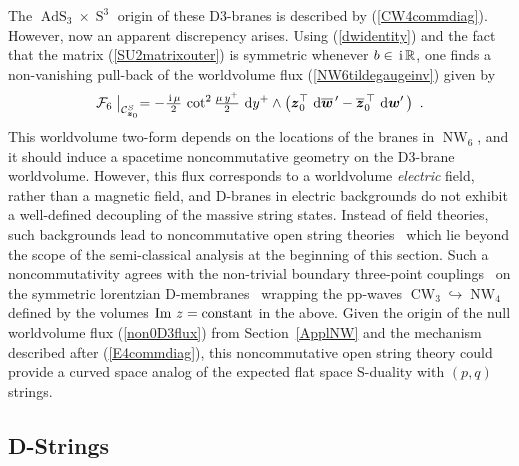 \documentclass[11pt,a4paper]{article}
\DeclareMathOperator{\AdS}{AdS}
\DeclareMathOperator{\Sphere}{S}
\DeclareMathOperator{\NW}{NW}
\DeclareMathOperator{\CW}{CW}
\let\S\Sphere
\newcommand{\ii}{{\rm i}}
\newcommand{\mbf}[1]{{\boldsymbol {#1} }}
\def\ii{{\,{\rm i}\,}}
\def\dd{{\rm d}}
\def\mz{{\mbf z}}
\def\mw{{\mbf w}}
\newcommand{\real}{{\mathbb R}} %
\newcommand{\beq}{\begin{eqnarray}}
\newcommand{\eeq}{\end{eqnarray}}
\begin{document}
The $\AdS_3\times\S^3$ origin of these D3-branes is described by
(\ref{CW4commdiag}). However, now an apparent discrepency
arises. Using (\ref{dwidentity}) and the fact that the matrix
(\ref{SU2matrixouter}) is symmetric whenever $b\in\ii\real$, one finds
a non-vanishing pull-back of the worldvolume flux
(\ref{NW6tildegaugeinv}) given by
\beq
\mathcal{F}_6\bigm|_{\mathcal{C}_{\mz_0}^S}=-\mbox{$\frac{\ii\mu}2$}\,
\cot^2\mbox{$\frac{\mu\,y^+}2$}~\dd y^+\wedge\left(\mz_0^\top~
\dd\overline{\mw}{}^{\,\prime}-\overline{\mz}{}_0^{\,\top}~
\dd\mw'\,\right) \ .
\label{non0D3flux}\eeq
This worldvolume two-form depends on the locations of the branes in
$\NW_6$, and it should induce a spacetime noncommutative geometry on
the D3-brane worldvolume. However, this flux corresponds to a worldvolume {\it
  electric} field, rather than a magnetic field, and D-branes in
electric backgrounds do not exhibit a well-defined decoupling of the
massive string states. Instead of field theories, such backgrounds
lead to noncommutative open string theories~\cite{GMMS1,SST1} which
lie beyond the scope of the semi-classical analysis at the beginning
of this section. Such a noncommutativity agrees with the non-trivial
boundary three-point couplings~\cite{DK2} on the symmetric lorentzian
D-membranes~\cite{FS1} wrapping the pp-waves
$\CW_3\hookrightarrow\NW_4$ defined by the volumes ${\rm Im}~z={\rm
  constant}$ in the above. Given the origin of the null worldvolume
flux (\ref{non0D3flux}) from Section~\ref{ApplNW} and the mechanism
described after (\ref{E4commdiag}), this noncommutative open string
theory could provide a curved space analog of the expected flat space
S-duality with $(p,q)$ strings.

\subsection{D-Strings\label{DStrings}}
\end{document}
